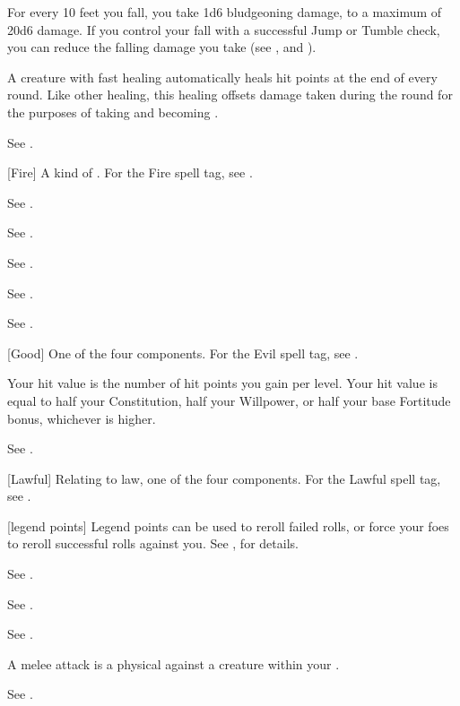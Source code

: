 For every 10 feet you fall, you take 1d6 bludgeoning damage, to a maximum of 20d6 damage.
If you control your fall with a successful Jump or Tumble check, you can reduce the falling damage you take (see , and ).

 A creature with fast healing automatically heals hit points at the end of every round.
Like other healing, this healing offsets damage taken during the round for the purposes of taking  and becoming \disabled.

 See .

[Fire] A kind of . For the Fire spell tag, see .

 See .

 See .

 See .

 See .

 See .

[Good] One of the four  components. For the Evil spell tag, see .

 Your hit value is the number of hit points you gain per level. Your hit value is equal to half your Constitution, half your Willpower, or half your base Fortitude bonus, whichever is higher.

 See .

[Lawful] Relating to law, one of the four  components. For the Lawful spell tag, see .

[legend points] Legend points can be used to reroll failed rolls, or force your foes to reroll successful rolls against you. See , for details.

 See .

 See .

 See .

 A melee attack is a physical  against a creature within your .

 See .

